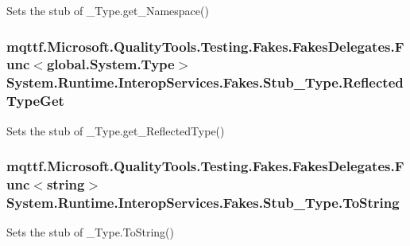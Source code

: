 Sets the stub of \-\_\-\-Type.\-get\-\_\-\-Namespace()

\hypertarget{class_system_1_1_runtime_1_1_interop_services_1_1_fakes_1_1_stub___type_ad31c5f923caa20593394870bb7f6f329}{
\subsubsection[{Reflected\-Type\-Get}]{\setlength{\rightskip}{0pt plus 5cm}mqttf.\-Microsoft.\-Quality\-Tools.\-Testing.\-Fakes.\-Fakes\-Delegates.\-Func$<$global.\-System.\-Type$>$ System.\-Runtime.\-Interop\-Services.\-Fakes.\-Stub\-\_\-\-Type.\-Reflected\-Type\-Get}}\label{class_system_1_1_runtime_1_1_interop_services_1_1_fakes_1_1_stub___type_ad31c5f923caa20593394870bb7f6f329}


Sets the stub of \-\_\-\-Type.\-get\-\_\-\-Reflected\-Type()

\hypertarget{class_system_1_1_runtime_1_1_interop_services_1_1_fakes_1_1_stub___type_af946b2b3d00d9bbbfc4fd991076fde70}{
\subsubsection[{To\-String}]{\setlength{\rightskip}{0pt plus 5cm}mqttf.\-Microsoft.\-Quality\-Tools.\-Testing.\-Fakes.\-Fakes\-Delegates.\-Func$<$string$>$ System.\-Runtime.\-Interop\-Services.\-Fakes.\-Stub\-\_\-\-Type.\-To\-String}}\label{class_system_1_1_runtime_1_1_interop_services_1_1_fakes_1_1_stub___type_af946b2b3d00d9bbbfc4fd991076fde70}


Sets the stub of \-\_\-\-Type.\-To\-String()

